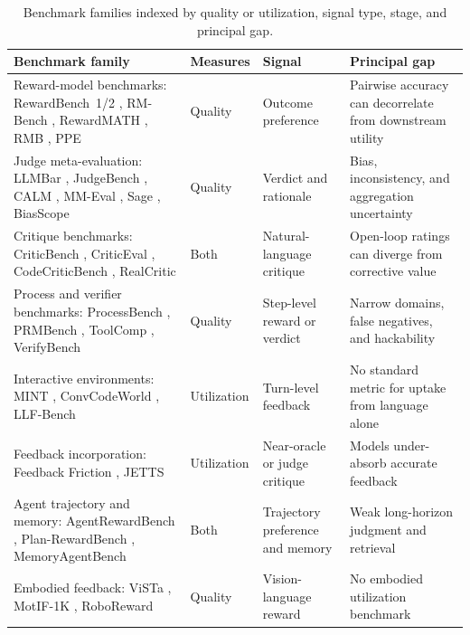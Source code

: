 \begin{table}[t]
\caption{Benchmark families indexed by quality or utilization, signal type, stage, and principal gap.}
\label{supp:tab-benchmarks}
\footnotesize
\begin{tabular}{@{}p{} p{} p{} p{}@{}}
\toprule
Benchmark family & Measures & Signal & Principal gap \\
\midrule
Reward-model benchmarks: RewardBench~1/2 \citep{lambert2024rewardbench,malik2025rewardbench}, RM-Bench \citep{liu2024rmbench}, RewardMATH \citep{kim2024evaluating}, RMB \citep{zhou2024rmb}, PPE \citep{frick2024how} & Quality & Outcome preference & Pairwise accuracy can decorrelate from downstream utility \\
Judge meta-evaluation: LLMBar \citep{zeng2023evaluating}, JudgeBench \citep{tan2024judgebench}, CALM \citep{ye2024justice}, MM-Eval \citep{son2024mmeval}, Sage \citep{feng2025are}, BiasScope \citep{lai2026biasscope} & Quality & Verdict and rationale & Bias, inconsistency, and aggregation uncertainty \\
Critique benchmarks: CriticBench \citep{lin2024criticbench}, CriticEval \citep{lan2024criticeval}, CodeCriticBench \citep{zhang2025codecriticbench}, RealCritic \citep{tang2025realcritic} & Both & Natural-language critique & Open-loop ratings can diverge from corrective value \\
Process and verifier benchmarks: ProcessBench \citep{zheng2024processbench}, PRMBench \citep{song2025prmbench}, ToolComp \citep{nath2025toolcomp}, VerifyBench \citep{yan2025verifybench} & Quality & Step-level reward or verdict & Narrow domains, false negatives, and hackability \\
Interactive environments: MINT \citep{wang2023mint}, ConvCodeWorld \citep{han2025convcodeworld}, LLF-Bench \citep{cheng2023llfbench} & Utilization & Turn-level feedback & No standard metric for uptake from language alone \\
Feedback incorporation: Feedback Friction \citep{jiang2025feedback}, JETTS \citep{zhou2025evaluating} & Utilization & Near-oracle or judge critique & Models under-absorb accurate feedback \\
Agent trajectory and memory: AgentRewardBench \citep{lu2025agentrewardbench}, Plan-RewardBench \citep{wang2026aligning}, MemoryAgentBench \citep{hu2025evaluating} & Both & Trajectory preference and memory & Weak long-horizon judgment and retrieval \\
Embodied feedback: ViSTa \citep{wybitul2024vista}, MotIF-1K \citep{hwang2024motif}, RoboReward \citep{lee2026roboreward} & Quality & Vision-language reward & No embodied utilization benchmark \\
\bottomrule
\end{tabular}
\end{table}

